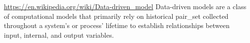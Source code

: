 \url{https://en.wikipedia.org/wiki/Data-driven_model}
Data-driven models are a class of computational models that primarily rely on historical pair_set collected throughout a system's or process' lifetime to establish relationships between input, internal, and output variables.
